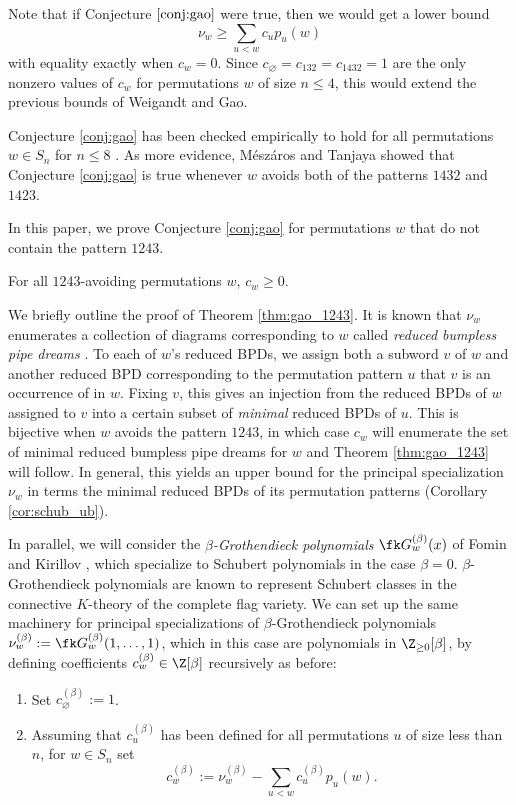 Note that if Conjecture $\ref{conj:gao}$ were true, then we would get a lower bound \[
    \nu_w \geq \sum_{u<w} c_up_u(w)
\]
with equality exactly when $c_w = 0$.
Since $c_\varnothing = c_{132} = c_{1432} = 1$ are the only nonzero values of $c_w$ for permutations $w$ of size $n\leq 4$, this would extend the previous bounds of Weigandt and Gao.

Conjecture \ref{conj:gao} has been checked empirically to hold for all permutations $w\in S_n$ for $n\leq 8$ \cite{Gao21}.
As more evidence, M\'esz\'aros and Tanjaya \cite{MT22} showed that Conjecture \ref{conj:gao} is true whenever $w$ avoids both of the patterns $1432$ and $1423$.

In this paper, we prove Conjecture \ref{conj:gao} for permutations $w$ that do not contain the pattern $1243$.
\begin{theorem}
\label{thm:gao_1243}
    For all $1243$-avoiding permutations $w$,
    $c_w\geq 0$.
\end{theorem}
We briefly outline the proof of Theorem \ref{thm:gao_1243}.
It is known that $\nu_w$ enumerates a collection of diagrams corresponding to $w$ called \textit{reduced bumpless pipe dreams} \cite{LLS21}.
To each of $w$'s reduced BPDs, we assign both a subword $v$ of $w$ and another reduced BPD corresponding to the permutation pattern $u$ that $v$ is an occurrence of in $w$.
Fixing $v$,
this gives an injection from the reduced BPDs of $w$ assigned to $v$ into a certain subset of \textit{minimal} reduced BPDs of $u$.
This is bijective when $w$ avoids the pattern $1243$, in which case $c_w$ will enumerate the set of minimal reduced bumpless pipe dreams for $w$ and Theorem \ref{thm:gao_1243} will follow.
In general, this yields an upper bound for the principal specialization $\nu_w$ in terms the minimal reduced BPDs of its permutation patterns (Corollary \ref{cor:schub_ub}).

In parallel, we will consider the \textit{$\beta$-Grothendieck polynomials} $\fk G^{(\beta)}_w(x)$ of Fomin and Kirillov \cite{FK94},
which specialize to Schubert polynomials in the case $\beta = 0$.
$\beta$-Grothendieck polynomials are known \cite{Hud14} to represent Schubert classes in the connective $K$-theory of the complete flag variety.
We can set up the same machinery for principal specializations of $\beta$-Grothendieck polynomials $\nu^{(\beta)}_w := \fk G^{(\beta)}_w(1,\dots,1)$,
which in this case are polynomials in $\Z_{\geq 0}[\beta]$,
by defining coefficients $c^{(\beta)}_w\in \Z[\beta]$ recursively as before:
\begin{enumerate}
    \item Set $c^{(\beta)}_\varnothing := 1$.
    \item Assuming that $c^{(\beta)}_u$ has been defined for all permutations $u$ of size less than $n$, for $w\in S_n$ set \[
        c^{(\beta)}_w :=
        \nu^{(\beta)}_w - \sum_{u<w} c^{(\beta)}_u p_u(w).
    \]
\end{enumerate}

